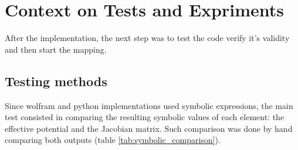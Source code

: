 \chapter{Context on Tests and Expriments}

After the implementation, the next step was to test the code
verify it's validity and then start the mapping.

\section{Testing methods}

Since wolfram and python implementations used symbolic 
expressions, the main test consisted in comparing the resulting
symbolic values of each element: the effective potential and
the Jacobian matrix. Such comparison was done by hand comparing
both outputs (table \ref{tab:symbolic_comparison}).

